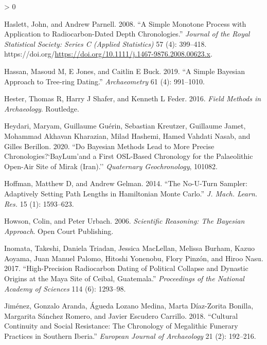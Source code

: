 \documentclass[
]{article}
\newlength{\cslhangindent}
\newenvironment{CSLReferences}[2] %
 {%
  \setlength{\parindent}{0pt}
  \ifodd #1 \everypar{\setlength{\hangindent}{\cslhangindent}}\ignorespaces\fi
  \ifnum #2 > 0
  \setlength{\parskip}{#2\baselineskip}
  \fi
 }%
 {}
\begin{document}
\begin{CSLReferences}{1}{0}
\leavevmode\hypertarget{ref-haslett_simple_2008}{}%
Haslett, John, and Andrew Parnell. 2008. {``A Simple Monotone Process
with Application to Radiocarbon-Dated Depth Chronologies.''}
\emph{Journal of the Royal Statistical Society: Series C (Applied
Statistics)} 57 (4): 399--418.
https://doi.org/\url{https://doi.org/10.1111/j.1467-9876.2008.00623.x}.

\leavevmode\hypertarget{ref-hassan_simple_2019}{}%
Hassan, Masoud M, E Jones, and Caitlin E Buck. 2019. {``A Simple
{Bayesian} Approach to Tree‐ring Dating.''} \emph{Archaeometry} 61 (4):
991--1010.

\leavevmode\hypertarget{ref-hester_field_2016}{}%
Hester, Thomas R, Harry J Shafer, and Kenneth L Feder. 2016. \emph{Field
Methods in Archaeology}. Routledge.

\leavevmode\hypertarget{ref-heydari_bayesian_2020}{}%
Heydari, Maryam, Guillaume Guérin, Sebastian Kreutzer, Guillaume Jamet,
Mohammad Akhavan Kharazian, Milad Hashemi, Hamed Vahdati Nasab, and
Gilles Berillon. 2020. {``Do Bayesian Methods Lead to More Precise
Chronologies?{}`{BayLum}'and a First {OSL}-Based Chronology for the
Palaeolithic Open-Air Site of {Mirak} ({Iran}).''} \emph{Quaternary
Geochronology}, 101082.

\leavevmode\hypertarget{ref-hoffman_no-u-turn_2014}{}%
Hoffman, Matthew D, and Andrew Gelman. 2014. {``The {No}-{U}-{Turn}
Sampler: Adaptively Setting Path Lengths in {Hamiltonian} {Monte}
{Carlo}.''} \emph{J. Mach. Learn. Res.} 15 (1): 1593--623.

\leavevmode\hypertarget{ref-howson_scientific_2006}{}%
Howson, Colin, and Peter Urbach. 2006. \emph{Scientific Reasoning: The
{Bayesian} Approach}. Open Court Publishing.

\leavevmode\hypertarget{ref-inomata_high-precision_2017}{}%
Inomata, Takeshi, Daniela Triadan, Jessica MacLellan, Melissa Burham,
Kazuo Aoyama, Juan Manuel Palomo, Hitoshi Yonenobu, Flory Pinzón, and
Hiroo Nasu. 2017. {``High-Precision Radiocarbon Dating of Political
Collapse and Dynastic Origins at the {Maya} Site of {Ceibal},
{Guatemala}.''} \emph{Proceedings of the National Academy of Sciences}
114 (6): 1293--98.

\leavevmode\hypertarget{ref-jimenez_cultural_2018}{}%
Jiménez, Gonzalo Aranda, Águeda Lozano Medina, Marta Díaz-Zorita
Bonilla, Margarita Sánchez Romero, and Javier Escudero Carrillo. 2018.
{``Cultural Continuity and Social Resistance: The Chronology of
Megalithic Funerary Practices in Southern {Iberia}.''} \emph{European
Journal of Archaeology} 21 (2): 192--216.


\end{CSLReferences}
\end{document}
